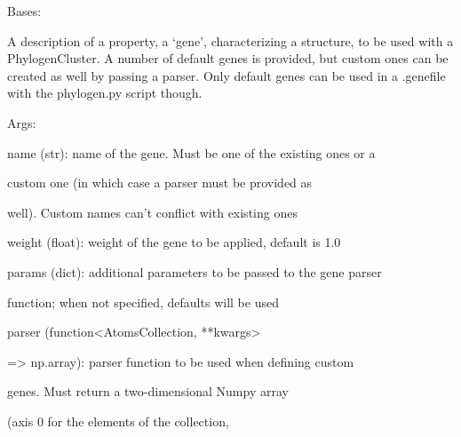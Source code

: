 \documentclass[letterpaper,10pt,english]{sphinxmanual}
\begin{document}
\begin{fulllineitems}
\label{doctree/soprano.analyse.phylogen.genes:soprano.analyse.phylogen.genes.Gene}
Bases: 

A description of a property, a `gene', characterizing a structure, to be
used with a PhylogenCluster. A number of default genes is provided, but
custom ones can be created as well by passing a parser. Only default genes
can be used in a .genefile with the phylogen.py script though.

\begin{DUlineblock}{0em}
\item[] Args:
\item[]
\begin{DUlineblock}{\DUlineblockindent}
\item[] name (str): name of the gene. Must be one of the existing ones or a
\item[]
\begin{DUlineblock}{\DUlineblockindent}
\item[] custom one (in which case a parser must be provided as
\item[] well). Custom names can't conflict with existing ones
\end{DUlineblock}
\item[] weight (float): weight of the gene to be applied, default is 1.0
\item[] params (dict): additional parameters to be passed to the gene parser
\item[]
\begin{DUlineblock}{\DUlineblockindent}
\item[] function; when not specified, defaults will be used
\end{DUlineblock}
\item[] parser (function\textless{}AtomsCollection, **kwargs\textgreater{}
\item[]
\begin{DUlineblock}{\DUlineblockindent}
\item[] =\textgreater{} np.array): parser function to be used when defining custom
\item[]
\begin{DUlineblock}{\DUlineblockindent}
\item[] genes. Must return a two-dimensional Numpy array
\item[] (axis 0 for the elements of the collection,

\end{DUlineblock}
\end{DUlineblock}
\end{DUlineblock}
\end{DUlineblock}
\end{fulllineitems}
\end{document}
